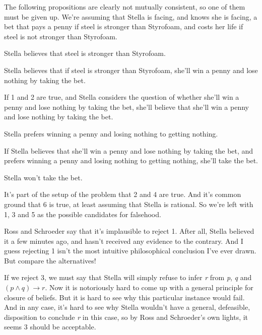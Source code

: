 The following propositions are clearly not mutually consistent, so one of them must be given up. We're assuming that Stella is facing, and knows she is facing, a bet that pays a penny if steel is stronger than Styrofoam, and costs her life if steel is not stronger than Styrofoam.

\begin{enumerate*}
\item Stella believes that steel is stronger than Styrofoam.

\item Stella believes that if steel is stronger than Styrofoam, she'll win a penny and lose nothing by taking the bet.

\item If 1 and 2 are true, and Stella considers the question of whether she'll win a penny and lose nothing by taking the bet, she'll believe that she'll win a penny and lose nothing by taking the bet.

\item Stella prefers winning a penny and losing nothing to getting nothing.

\item If Stella believes that she'll win a penny and lose nothing by taking the bet, and prefers winning a penny and losing nothing to getting nothing, she'll take the bet.

\item Stella won't take the bet.

\end{enumerate*}
It's part of the setup of the problem that 2 and 4 are true. And it's common ground that 6 is true, at least assuming that Stella is rational. So we're left with 1, 3 and 5 as the possible candidates for falsehood.

Ross and Schroeder say that it's implausible to reject 1. After all, Stella believed it a few minutes ago, and hasn't received any evidence to the contrary. And I guess rejecting 1 isn't the most intuitive philosophical conclusion I've ever drawn. But compare the alternatives!

If we reject 3, we must say that Stella will simply refuse to infer \emph{r} from \emph{p}, \emph{q} and $(p \wedge q) \rightarrow r$. Now it is notoriously hard to come up with a general principle for closure of beliefs. But it is hard to see why this particular instance would fail. And in any case, it's hard to see why Stella wouldn't have a general, defeasible, disposition to conclude \emph{r} in this case, so by Ross and Schroeder's own lights, it seems 3 should be acceptable.

